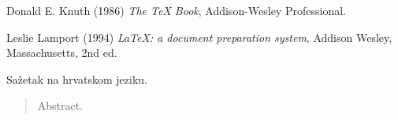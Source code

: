\documentclass[times, utf8, zavrsni]{fer}
\begin{document}




\begin{thebibliography}{9}
    Donald E. Knuth (1986) \emph{The \TeX{} Book}, Addison-Wesley Professional.
    
    Leslie Lamport (1994) \emph{\LaTeX: a document preparation system}, Addison
    Wesley, Massachusetts, 2nd ed.
    \end{thebibliography}
    


\begin{sazetak}
Sažetak na hrvatskom jeziku.

\end{sazetak}

\begin{abstract}
Abstract.

\end{abstract}
\end{document}
